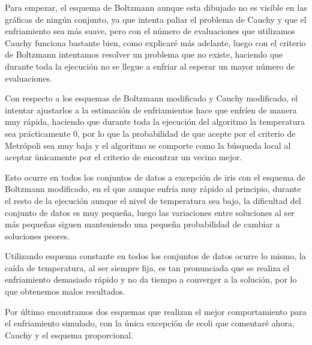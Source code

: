 \documentclass[12pt, spanish]{article}
\begin{document}
Para empezar, el esquema de Boltzmann aunque esta dibujado no es visible en las gráficas de ningún conjunto, ya que intenta paliar el problema de Cauchy y que el enfriamiento sea más suave, pero con el número de evaluaciones que utilizamos Cauchy funciona bastante bien, como explicaré más adelante, luego con el criterio de Boltzmann intentamos resolver un problema que no existe, haciendo que durante toda la ejecución no se llegue a enfriar al esperar un mayor número de evaluaciones.


Con respecto a los esquemas de Boltzmann modificado y Cauchy modificado, el intentar ajustarlos a la estimación de enfriamientos hace que enfríen de manera muy rápida, haciendo que durante toda la ejecución del algoritmo la temperatura sea prácticamente 0, por lo que la probabilidad de que acepte por el criterio de Metrópoli sea muy baja y el algoritmo se comporte como la búsqueda local al aceptar únicamente por el criterio de encontrar un vecino mejor. 

Esto ocurre en todos los conjuntos de datos a excepción de iris con el esquema de Boltzmann modificado, en el que aunque enfría muy rápido al principio, durante el resto de la ejecución aunque el nivel de temperatura sea bajo, la dificultad del conjunto de datos es muy pequeña, luego las variaciones entre soluciones al ser más pequeñas siguen manteniendo una pequeña probabilidad de cambiar a soluciones peores.

Utilizando esquema constante en todos los conjuntos de datos ocurre lo mismo, la caída de temperatura, al ser siempre fija, es tan pronunciada que se realiza el enfriamiento demasiado rápido y no da tiempo a converger a la solución, por lo que obtenemos malos resultados.

Por último encontramos dos esquemas que realizan el mejor comportamiento para el enfriamiento simulado, con la única excepción de ecoli que comentaré ahora, Cauchy y el esquema proporcional.
\end{document}
